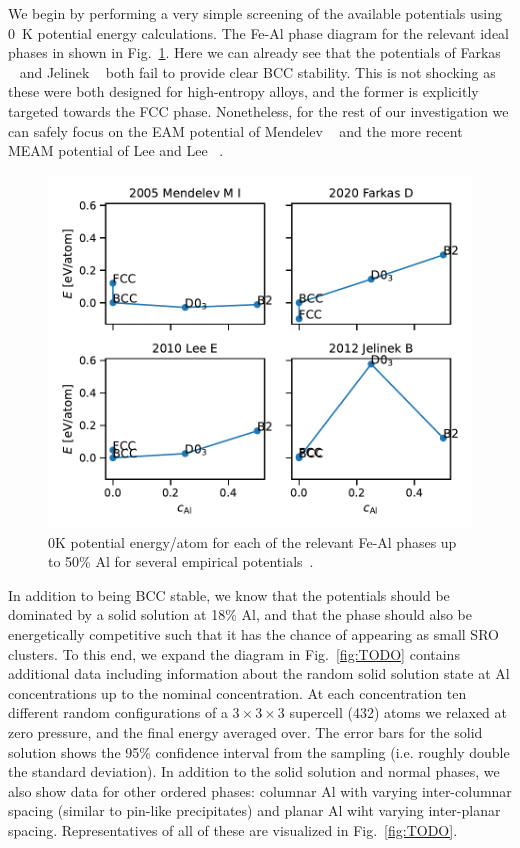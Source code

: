 We begin by performing a very simple screening of the available potentials using 0~K potential energy calculations.
The Fe-Al phase diagram for the relevant ideal phases in shown in Fig.~\ref{fig:0K_phases}.
Here we can already see that the potentials of Farkas \etal~\cite{farkas2020model} and Jelinek \etal~\cite{jelinek2012modified} both fail to provide clear BCC stability.
This is not shocking as these were both designed for high-entropy alloys, and the former is explicitly targeted towards the FCC phase.
Nonetheless, for the rest of our investigation we can safely focus on the EAM potential of Mendelev \etal~\cite{mendelev2005effect} and the more recent MEAM potential of Lee and Lee \etal~\cite{lee2010modified}.
%
\begin{figure}[h]
    \centering
    \includegraphics[width=\textwidth]{figures/zerok_phases}
    \caption{0K potential energy/atom for each of the relevant Fe-Al phases up to 50\% Al for several empirical potentials~\cite{mendelev2005effect, lee2010modified, jelinek2012modified, farkas2020model}.}
    \label{fig:0K_phases}
\end{figure}

In addition to being BCC stable, we know that the potentials should be dominated by a solid solution at 18\% Al, and that the \DOTHREE phase should also be energetically competitive such that it has the chance of appearing as small SRO clusters.
To this end, we expand the diagram in Fig.~\ref{fig:TODO} contains additional data including information about the random solid solution state at Al concentrations up to the nominal \DOTHREE concentration.
At each concentration ten different random configurations of a $3\times3\times3$ supercell (432) atoms we relaxed at zero pressure, and the final energy averaged over.
The error bars for the solid solution shows the 95\% confidence interval from the sampling (i.e. roughly double the standard deviation).
In addition to the solid solution and normal phases, we also show data for other ordered phases: columnar Al with varying inter-columnar spacing (similar to pin-like \BTWO precipitates) and planar Al wiht varying inter-planar spacing.
Representatives of all of these are visualized in Fig.~\ref{fig:TODO}.

